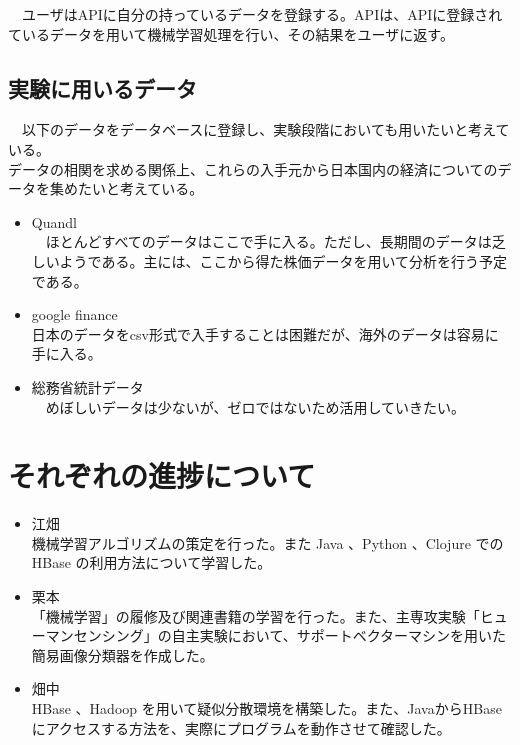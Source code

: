 \documentclass{scrartcl}
\begin{document}
　ユーザはAPIに自分の持っているデータを登録する。APIは、APIに登録されているデータを用いて機械学習処理を行い、その結果をユーザに返す。\\

\subsection{実験に用いるデータ}
\label{sec:org3a61408}
　以下のデータをデータベースに登録し、実験段階においても用いたいと考えている。\\
   データの相関を求める関係上、これらの入手元から日本国内の経済についてのデータを集めたいと考えている。\\

\begin{itemize}
\item Quandl\\
　ほとんどすべてのデータはここで手に入る。ただし、長期間のデータは乏しいようである。主には、ここから得た株価データを用いて分析を行う予定である。\\
\item google finance\\
日本のデータをcsv形式で入手することは困難だが、海外のデータは容易に手に入る。\\
\item 総務省統計データ\\
　めぼしいデータは少ないが、ゼロではないため活用していきたい。\\
\end{itemize}

\section{それぞれの進捗について}
\label{sec:org4e0996c}
\begin{itemize}
\item 江畑\\
機械学習アルゴリズムの策定を行った。また Java 、Python 、Clojure での HBase の利用方法について学習した。\\
\item 栗本\\
「機械学習」の履修及び関連書籍の学習を行った。また、主専攻実験「ヒューマンセンシング」の自主実験において、サポートベクターマシンを用いた簡易画像分類器を作成した。\\
\item 畑中\\
HBase 、Hadoop を用いて疑似分散環境を構築した。また、JavaからHBaseにアクセスする方法を、実際にプログラムを動作させて確認した。\\
\end{itemize}
\end{document}

